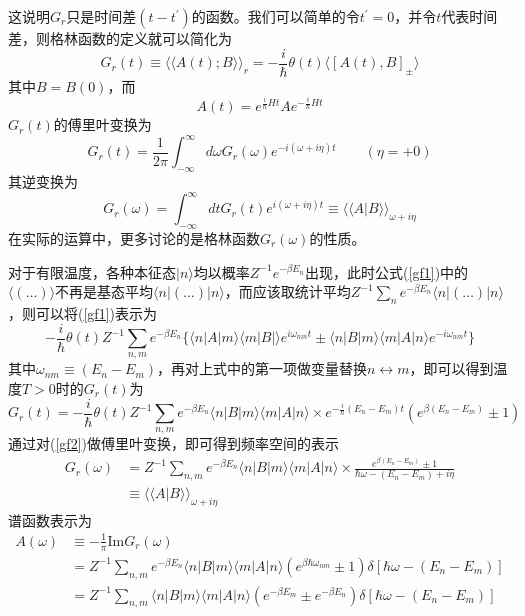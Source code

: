 这说明$G_r$只是时间差$(t-t^{'})$的函数。我们可以简单的令$t^{'}=0$，并令$t$代表时间差，则格林函数的定义就可以简化为
\begin{equation}
G_r(t)\equiv\langle\langle A(t);B\rangle\rangle_r=-\frac{i}{\hbar}\theta(t)\langle\left[A(t),B\right]_\pm\rangle\label{gf1}
\end{equation}
其中$B=B(0)$，而
\begin{equation}
A(t)=e^{\frac{i}{\hbar}H t}Ae^{-\frac{i}{\hbar }H t}
\end{equation}
$G_r(t)$的傅里叶变换为
\begin{equation}
G_r(t)=\frac{1}{2\pi}\int_{-\infty}^{\infty}d\omega G_r(\omega)e^{-i(\omega+i\eta)t}\qquad(\eta=+0)
\end{equation}
其逆变换为
\begin{equation}
G_r(\omega)=\int_{-\infty}^{\infty}dtG_r(t)e^{i(\omega+i\eta)t}\equiv\langle\langle A|B\rangle\rangle_{\omega+i\eta}\label{gr}
\end{equation}
在实际的运算中，更多讨论的是格林函数$G_r(\omega)$的性质。

 对于有限温度，各种本征态$|n\rangle$均以概率$Z^{-1}e^{-\beta E_n}$出现，此时公式(\ref{gf1})中的$\langle(\dots)\rangle$不再是基态平均$\langle n|(\dots)|n\rangle$，而应该取统计平均$Z^{-1}\sum_ne^{-\beta E_n}\langle n|(\dots)|n\rangle$，则可以将(\ref{gf1})表示为
\begin{equation}
-\frac{i}{\hbar}\theta(t)Z^{-1}\sum_{n,m}e^{-\beta E_n}\{\langle n|A|m\rangle\langle m|B|\rangle e^{i\omega_{nm}t}\pm\langle n|B|m\rangle\langle m|A|n\rangle e^{-i\omega_{nm}t}\}
\end{equation}
其中$\omega_{nm}\equiv(E_n-E_m)$，再对上式中的第一项做变量替换$n\leftrightarrow m$，即可以得到温度$T>0$时的$G_r(t)$为
\begin{equation}
G_r(t)=-\frac{i}{\hbar}\theta(t)Z^{-1}\sum_{n,m}e^{-\beta E_n}\langle n|B|m\rangle\langle m|A|n\rangle\times e^{-\frac{i}{\hbar}(E_n-E_m)t}(e^{\beta(E_n-E_m)}\pm 1)\label{gf2}
\end{equation}
通过对(\ref{gf2})做傅里叶变换，即可得到频率空间的表示
\begin{equation}
\begin{aligned}
G_r(\omega)&=Z^{-1}\sum_{n,m}e^{-\beta E_n}\langle n|B|m\rangle\langle m|A|n\rangle\times\frac{e^{\beta(E_n-E_m)}\pm 1}{\hbar\omega-(E_n-E_m)+i\eta}\\
&\equiv\langle\langle A|B\rangle\rangle_{\omega+i\eta}\label{gf3}
\end{aligned}
\end{equation}
谱函数表示为
\begin{equation}
\begin{aligned}
A(\omega)&\equiv-\frac{1}{\pi}\mathrm{Im}G_r(\omega)\\
&=Z^{-1}\sum_{n,m}e^{-\beta E_n}\langle n|B|m\rangle\langle  m|A|n\rangle(e^{\beta\hbar\omega_{nm}}\pm 1)\delta\left[\hbar\omega-(E_n-E_m)\right]\\
&=Z^{-1}\sum_{n,m}\langle n|B|m\rangle\langle  m|A|n\rangle(e^{-\beta E_m}\pm e^{-\beta E_n})\delta\left[\hbar\omega-(E_n-E_m)\right]
\end{aligned}
\end{equation}

